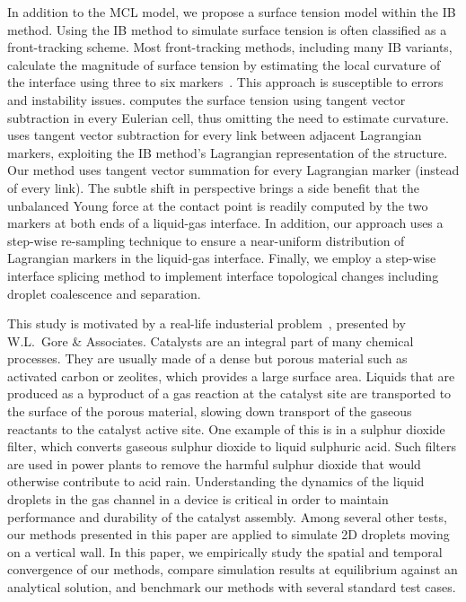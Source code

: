 \documentclass{jfm}
\begin{document}
In addition to the MCL model, we propose a surface tension model within the IB method. Using the IB method to simulate surface tension is often classified as a front-tracking scheme. Most front-tracking methods, including many IB variants, calculate the magnitude of surface tension by estimating the local curvature of the interface using three to six markers~\citep{leveque1997immersed, huang2018improved}. This approach is susceptible to errors and instability issues. \citet{tryggvason2001front} computes the surface tension using tangent vector subtraction in every Eulerian cell, thus omitting the need to estimate curvature. \citet{popinet1999front} uses tangent vector subtraction for every link between adjacent Lagrangian markers, exploiting the IB method's Lagrangian representation of the structure. Our method uses tangent vector summation for every Lagrangian marker (instead of every link). The subtle shift in perspective brings a side benefit that the unbalanced Young force \citep{quian2003generalized} at the contact point is readily computed by the two markers at both ends of a liquid-gas interface. In addition, our approach uses a step-wise re-sampling technique to ensure a near-uniform distribution of Lagrangian markers in the liquid-gas interface. Finally, we employ a step-wise interface splicing method to implement interface topological changes including droplet coalescence and separation. 

This study is motivated by a real-life industerial problem~\citep{MPIreport2018}, presented by W.L.~Gore \& Associates. Catalysts are an integral part of many chemical processes. They are usually made of a dense but porous material such as activated carbon or zeolites, which provides a large surface area. Liquids that are produced as a byproduct of a gas reaction at the catalyst site are transported to the surface of the porous material, slowing down transport of the gaseous reactants to the catalyst active site. One example of this is in a sulphur dioxide filter, which converts gaseous sulphur dioxide to liquid sulphuric acid. Such filters are used in power plants to remove the harmful sulphur dioxide that would otherwise contribute to acid rain. Understanding the dynamics of the liquid droplets in the gas channel in a device is critical in order to maintain performance and durability of the catalyst assembly. %
Among several other tests, our methods presented in this paper are applied to simulate 2D droplets moving on a vertical wall. In this paper, we empirically study the spatial and temporal convergence of our methods, compare simulation results at equilibrium against an analytical solution, and benchmark our methods with several standard test cases.
\end{document}
